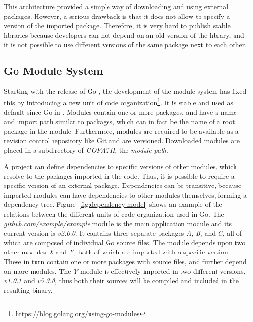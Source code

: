 This architecture provided a simple way of downloading and using external packages.
However, a serious drawback is that it does not allow to specify a version of the imported package.
Therefore, it is very hard to publish stable libraries because developers can not depend on an old version of the
library, and it is not possible to use different versions of the same package next to each other.



\subsection{Go Module System}\label{subsec:background:dependencies:modules}

Starting with the release of Go , the development of the module system has fixed this by introducing a
new unit of code organization\footnote{\url{https://blog.golang.org/using-go-modules}}.
It is stable and used as default since Go  in .
Modules contain one or more packages, and have a name and import path similar to packages, which can in fact be the name
of a root package in the module.
Furthermore, modules are required to be available as a revision control repository like Git and are versioned.
Downloaded modules are placed in a subdirectory of \textit{GOPATH}, the \textit{module path}.

A project can define dependencies to specific versions of other modules, which resolve to the packages imported in the
code.
Thus, it is possible to require a specific version of an external package.
Dependencies can be transitive, because imported modules can have dependencies to other modules themselves,
forming a dependency tree.
Figure~\ref{fig:dependency-model} shows an example of the relations between the different units of code organization
used in Go.
The \textit{github.com/example/example} module is the main application module and its current version is
\textit{v2.0.0}.
It contains three separate packages \textit{A}, \textit{B}, and \textit{C}, all of which are composed of individual Go
source files.
The module depends upon two other modules \textit{X} and \textit{Y}, both of which are imported with a specific version.
These in turn contain one or more packages with source files, and further depend on more modules.
The \textit{Y} module is effectively imported in two different versions, \textit{v1.0.1} and \textit{v5.3.0}, thus both
their sources will be compiled and included in the resulting binary.


